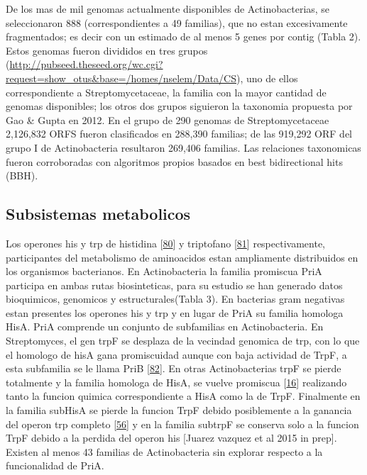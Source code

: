 \documentclass[12pt,twoside]{reedthesis}
\begin{document}
  De los mas de mil genomas actualmente disponibles de Actinobacterias, se
  seleccionaron 888 (correspondientes a 49 familias), que no estan
  excesivamente fragmentados; es decir con un estimado de al menos 5 genes
  por contig (Tabla 2). Estos genomas fueron divididos en tres grupos
  (\url{http://pubseed.theseed.org/wc.cgi?request=show_otus\&base=/homes/nselem/Data/CS}),
  uno de ellos correspondiente a Streptomycetaceae, la familia con la
  mayor cantidad de genomas disponibles; los otros dos grupos siguieron la
  taxonomia propuesta por Gao \& Gupta en 2012. En el grupo de 290 genomas
  de Streptomycetaceae 2,126,832 ORFS fueron clasificados en 288,390
  familias; de las 919,292 ORF del grupo I de Actinobacteria resultaron
  269,406 familias. Las relaciones taxonomicas fueron corroboradas con
  algoritmos propios basados en best bidirectional hits (BBH).
  
  \subsection{Subsistemas metabolicos}\label{subsistemas-metabolicos}
  
  Los operones his y trp de histidina
  {[}\protect\hyperlink{ref-fondi_evolution_2009}{80}{]} y triptofano
  {[}\protect\hyperlink{ref-merino_evolution_2008}{81}{]} respectivamente,
  participantes del metabolismo de aminoacidos estan ampliamente
  distribuidos en los organismos bacterianos. En Actinobacteria la familia
  promiscua PriA participa en ambas rutas biosinteticas, para su estudio
  se han generado datos bioquimicos, genomicos y estructurales(Tabla 3).
  En bacterias gram negativas estan presentes los operones his y trp y en
  lugar de PriA su familia homologa HisA. PriA comprende un conjunto de
  subfamilias en Actinobacteria. En Streptomyces, el gen trpF se desplaza
  de la vecindad genomica de trp, con lo que el homologo de hisA gana
  promiscuidad aunque con baja actividad de TrpF, a esta subfamilia se le
  llama PriB
  {[}\protect\hyperlink{ref-verduzco-castro_co-occurrence_2016}{82}{]}. En
  otras Actinobacterias trpF se pierde totalmente y la familia homologa de
  HisA, se vuelve promiscua
  {[}\protect\hyperlink{ref-baronagomez_occurrence_2003}{16}{]} realizando
  tanto la funcion quimica correspondiente a HisA como la de TrpF.
  Finalmente en la familia subHisA se pierde la funcion TrpF debido
  posiblemente a la ganancia del operon trp completo
  {[}\protect\hyperlink{ref-noda-garcia_evolution_2013}{56}{]} y en la
  familia subtrpF se conserva solo a la funcion TrpF debido a la perdida
  del operon his {[}Juarez vazquez et al 2015 in prep{]}. Existen al menos
  43 familias de Actinobacteria sin explorar respecto a la funcionalidad
  de PriA.
  
\end{document}
